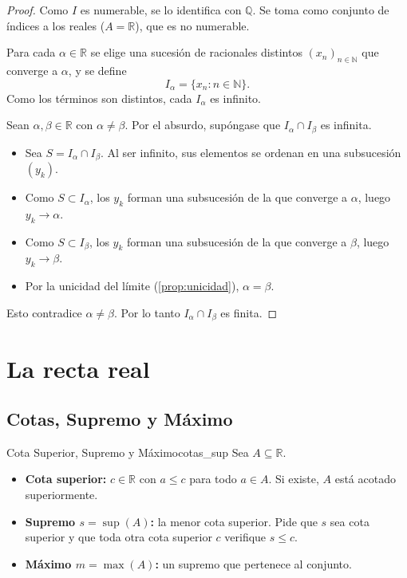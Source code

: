 \documentclass[11pt, a4paper]{article}
\begin{document}
\begin{proof}
Como $I$ es numerable, se lo identifica con $\mathbb{Q}$. Se toma como conjunto de índices a los
reales ($A = \mathbb{R}$), que es no numerable.

Para cada $\alpha \in \mathbb{R}$ se elige una sucesión de racionales distintos
$(x_n)_{n \in \mathbb{N}}$ que converge a $\alpha$, y se define
$$ I_{\alpha} = \{ x_n : n \in \mathbb{N} \}. $$
Como los términos son distintos, cada $I_{\alpha}$ es infinito.

Sean $\alpha, \beta \in \mathbb{R}$ con $\alpha \neq \beta$. Por el absurdo, supóngase que
$I_{\alpha} \cap I_{\beta}$ es infinita.
\begin{itemize}
    \item Sea $S = I_{\alpha} \cap I_{\beta}$. Al ser infinito, sus elementos se ordenan en una
    subsucesión $(y_k)$.
    \item Como $S \subset I_{\alpha}$, los $y_k$ forman una subsucesión de la que converge a
    $\alpha$, luego $y_k \to \alpha$.
    \item Como $S \subset I_{\beta}$, los $y_k$ forman una subsucesión de la que converge a $\beta$,
    luego $y_k \to \beta$.
    \item Por la unicidad del límite (\ref{prop:unicidad}), $\alpha = \beta$.
\end{itemize}
Esto contradice $\alpha \neq \beta$. Por lo tanto $I_{\alpha} \cap I_{\beta}$ es finita.
\end{proof}

\newpage

\section{La recta real}

\subsection{Cotas, Supremo y Máximo}

\begin{definicion}{Cota Superior, Supremo y Máximo}{cotas_sup}
Sea $A \subseteq \mathbb{R}$.
\begin{itemize}
    \item \textbf{Cota superior:} $c \in \mathbb{R}$ con $a \le c$ para todo $a \in A$. Si existe,
    $A$ está acotado superiormente.
    \item \textbf{Supremo $s = \sup(A)$:} la menor cota superior. Pide que $s$ sea cota superior y
    que toda otra cota superior $c$ verifique $s \le c$.
    \item \textbf{Máximo $m = \max(A)$:} un supremo que pertenece al conjunto.
\end{itemize}
\end{definicion}
\end{document}
